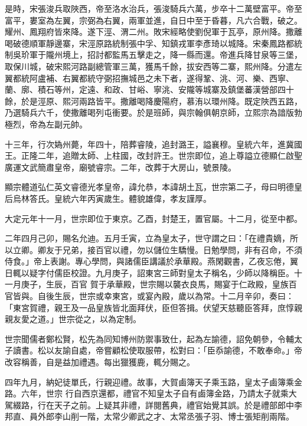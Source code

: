 \begin{pinyinscope}
 是時，宋張浚兵取陜西，帝至洛水治兵，張浚騎兵六萬，步卒十二萬壁富平。帝至富平，婁室為左翼，宗弼為右翼，兩軍並進，自日中至于昏暮，凡六合戰，破之。耀州、鳳翔府皆來降。遂下涇、渭二州。敗宋經略使劉倪軍于瓦亭，原州降。撒離喝破德順軍靜邊寨，宋涇原路統制張中孚、知鎮戎軍李彥琦以城降。宋秦鳳路都統制吳玠軍于隴州境上，招討都監馬五擊走之，降一縣而還。帝進兵降甘泉等三堡，取保川城，破宋熙河路副總管軍三萬，獲馬千餘，拔安西等二寨，熙州降。分遣左
 翼都統阿盧補、右翼都統守弼招撫城邑之未下者，遂得鞏、洮、河、樂、西寧、蘭、廓、積石等州，定遠、和政、甘峪、寧洮、安隴等城寨及鎮堡蕃漢營部四十餘，於是涇原、熙河兩路皆平。撒離喝降慶陽府，慕洧以環州降。既定陜西五路，乃選騎兵六千，使撒離喝列屯衝要。於是班師，與宗翰俱朝京師，立熙宗為諳版勃極烈，帝為左副元帥。



 十三年，行次媯州薨，年四十，陪葬睿陵，追封潞王，謚襄穆。皇統六年，進冀國王。正隆二年，追贈太師、上柱國，改封許王。世宗即位，追上尊謚立德顯仁啟聖廣運文武簡肅皇帝，廟號睿宗。二年，改葬于大房山，號景陵。



 顯宗體道弘仁英文睿德光孝皇帝，諱允恭，本諱胡土瓦，世宗第二子，母曰明德皇后烏林答氏。皇統六年丙寅歲生。體貌雄偉，孝友謹厚。



 大定元年十一月，世宗即位于東京。乙酉，封楚王，置官屬。十二月，從至中都。



 二年四月己卯，賜名允迪。五月壬寅，立為皇太子，世守謂之曰：「在禮貴嫡，所以立卿。卿友于兄弟，接百官以禮，勿以儲位生驕慢。日勉學問，非有召命，不須侍食。」帝上表謝。專心學問，與諸儒臣講議於承華殿。燕閑觀書，乙夜忘倦，翼日輒以疑字付儒臣校證。九月庚子，詔東宮三師對皇太子稱名，少師以降稱臣。十一月庚子，生辰，百官
 賀于承華殿，世宗賜以襲衣良馬，賜宴于仁政殿，皇族百官皆與。自後生辰，世宗或幸東宮，或宴內殿，歲以為常。十二月辛卯，奏曰：「東宮賀禮，親王及一品皇族皆北面拜伏，臣但答揖。伏望天慈聽臣答拜，庶惇親親友愛之道。」世宗從之，以為定制。



 世宗聞儒者鄭松賢，松先為同知博州防禦事致仕，起為左諭德，詔免朝參，令輔太子讀書。松以友諭自處，帝嘗顧松使取服帶，松對曰：「臣忝諭德，不敢奉命。」帝改容稱善，自是益加禮遇。每出獵獲鹿，輒分賜之。



 四年九月，納妃徒單氏，行親迎禮。故事，大賀鹵簿天子乘玉路，皇太子鹵簿乘金路。六年，世宗
 行自西京還都，禮官不知皇太子自有鹵簿金路，乃請太子就乘大駕綴路，行在天子之前。上疑其非禮，詳閱舊典，禮官始覺其誤。於是禮部郎中李邦直、員外郎李山削一階，太常少卿武之才、太常丞張子羽、博士張矩削兩階。




\end{pinyinscope}

